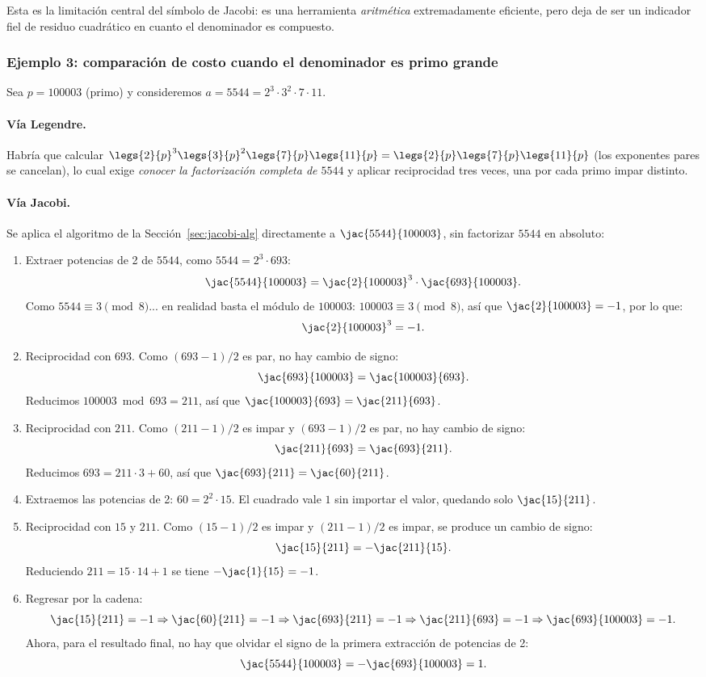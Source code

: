 Esta es la limitación central del símbolo de Jacobi: es una herramienta \emph{aritmética} extremadamente eficiente, pero deja de ser un indicador fiel de residuo cuadrático en cuanto el denominador es compuesto.

\subsubsection{Ejemplo 3: comparación de costo cuando el denominador es primo grande}

Sea $p=100003$ (primo) y consideremos $a=5544=2^3\cdot3^2\cdot7\cdot11$.

\paragraph{Vía Legendre.} Habría que calcular $\legs{2}{p}^3\legs{3}{p}^2\legs{7}{p}\legs{11}{p}=\legs{2}{p}\legs{7}{p}\legs{11}{p}$ (los exponentes pares se cancelan), lo cual exige \emph{conocer la factorización completa de $5544$} y aplicar reciprocidad tres veces, una por cada primo impar distinto.

\paragraph{Vía Jacobi.} Se aplica el algoritmo de la Sección~\ref{sec:jacobi-alg} directamente a $\jac{5544}{100003}$, sin factorizar $5544$ en absoluto:
\begin{enumerate}
\item Extraer potencias de 2 de $5544$, como $5544=2^3\cdot 693$:
\[
\jac{5544}{100003}=\jac{2}{100003}^3 \cdot \jac{693}{100003}.
\]
Como $5544 \equiv 3 \pmod{8}$... en realidad basta el módulo de $100003$: $100003 \equiv 3 \pmod 8$, así que $\jac{2}{100003}=-1$, por lo que:
\[
\jac{2}{100003}^3 =-1.
\]
\item Reciprocidad con $693$. Como $(693-1)/2$ es par, no hay cambio de signo:
\[
\jac{693}{100003}=\jac{100003}{693}.
\]
Reducimos $100003 \bmod 693 = 211$, así que $\jac{100003}{693}=\jac{211}{693}$.
\item Reciprocidad con $211$. Como $(211-1)/2$ es impar y $(693-1)/2$ es par, no hay cambio de signo:
\[
\jac{211}{693}=\jac{693}{211}.
\]
Reducimos $693=211 \cdot 3 +60$, así que $\jac{693}{211}=\jac{60}{211}$.
\item Extraemos las potencias de 2: $60= 2^2 \cdot 15$. El cuadrado vale $1$ sin importar el valor, quedando solo $\jac{15}{211}$.
\item Reciprocidad con $15$ y $211$. Como $(15-1)/2$ es impar y $(211-1)/2$ es impar, se produce un cambio de signo:
\[
\jac{15}{211}=-\jac{211}{15}.
\]
Reduciendo $211=15 \cdot 14 +1$ se tiene $-\jac{1}{15}=-1$.
\item Regresar por la cadena:
\[
\jac{15}{211}=-1 \Rightarrow \jac{60}{211} =-1 \Rightarrow \jac{693}{211}=-1
 \Rightarrow \jac{211}{693} =-1  \Rightarrow \jac{693}{100003}=-1.
\]
Ahora, para el resultado final, no hay que olvidar el signo de la primera extracción de potencias de 2:
\[
\jac{5544}{100003}=-\jac{693}{100003} = 1.
\]
\end{enumerate}

